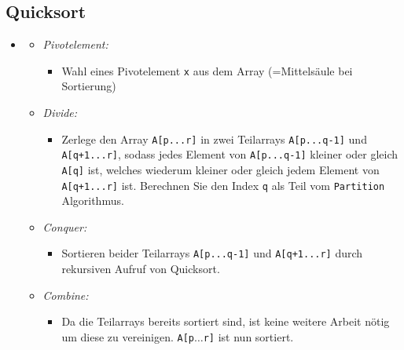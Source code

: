 \documentclass[
    ngerman,
    color=3b,
    load_common, %
    summary,
    boxarc,
]{tuda_summary}
\begin{document}
\subsection{Quicksort}\label{Quicksort}
\begin{itemize}
    \item {}
          \begin{itemize}
              \item \textit{Pivotelement:}
                    \begin{itemize}
                        \item[]
                              Wahl eines Pivotelement \texttt{x} aus dem Array (=Mittelsäule bei Sortierung)
                    \end{itemize}

              \item \textit{Divide:}
                    \begin{itemize}
                        \item[]
                              Zerlege den Array \texttt{A[p...r]} in zwei Teilarrays \texttt{A[p...q-1]} und \texttt{A[q+1...r]},
                              sodass jedes Element von \texttt{A[p...q-1]} kleiner oder gleich \texttt{A[q]} ist, welches
                              wiederum kleiner oder gleich jedem Element von \texttt{A[q+1...r]} ist. Berechnen Sie den Index \texttt{q}
                              als Teil vom \texttt{Partition} Algorithmus.
                    \end{itemize}

              \item \textit{Conquer:}
                    \begin{itemize}
                        \item[]
                              Sortieren beider Teilarrays \texttt{A[p...q-1]} und \texttt{A[q+1...r]} durch rekursiven Aufruf von
                              Quicksort.
                    \end{itemize}

              \item \textit{Combine:}
                    \begin{itemize}
                        \item[]
                              Da die Teilarrays bereits sortiert sind, ist keine weitere Arbeit nötig um diese zu vereinigen.
                              \texttt{A[p$\ldots$r]} ist nun sortiert.
                    \end{itemize}
          \end{itemize}


\end{itemize}
\end{document}
